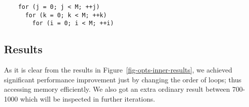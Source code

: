 \begin{verbatim}
    for (j = 0; j < M; ++j)
      for (k = 0; k < M; ++k)
        for (i = 0; i < M; ++i)
\end{verbatim}
\smallskip

\clearpage

\subsection{Results}



As it is clear from the results in Figure~\ref{fig-opts-inner-results},
we achieved significant performance improvement just by changing the
order of loops; thus accessing memory efficiently. We also got an extra
ordinary result between 700-1000 which will be inspected in further
iterations.
\medskip
